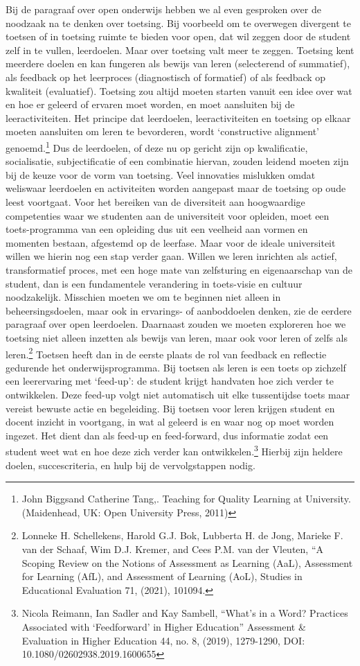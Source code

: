\documentclass[empirical, authordate, ]{new-jote-article}
\begin{document}
	Bij de paragraaf over open onderwijs hebben we al even gesproken over de noodzaak na te denken over toetsing. Bij voorbeeld om te overwegen divergent te toetsen of in toetsing ruimte te bieden voor open, dat wil zeggen door de student zelf in te vullen, leerdoelen. Maar over toetsing valt meer te zeggen. Toetsing kent meerdere doelen en kan fungeren als bewijs van leren (selecterend of summatief), als feedback op het leerproces (diagnostisch of formatief) of als feedback op kwaliteit (evaluatief). Toetsing zou altijd moeten starten vanuit een idee over wat en hoe er geleerd of ervaren moet worden, en moet aansluiten bij de leeractiviteiten. Het principe dat leerdoelen, leeractiviteiten en toetsing op elkaar moeten aansluiten om leren te bevorderen, wordt ‘constructive alignment' genoemd.\footnote{John Biggsand Catherine Tang,. Teaching for Quality Learning at University. (Maidenhead, UK: Open University Press, 2011)} Dus de leerdoelen, of deze nu op gericht zijn op kwalificatie, socialisatie, subjectificatie of een combinatie hiervan, zouden leidend moeten zijn bij de keuze voor de vorm van toetsing. Veel innovaties mislukken omdat weliswaar leerdoelen en activiteiten worden aangepast maar de toetsing op oude leest voortgaat. Voor het bereiken van de diversiteit aan hoogwaardige competenties waar we studenten aan de universiteit voor opleiden, moet een toets-programma van een opleiding dus uit een veelheid aan vormen en momenten bestaan, afgestemd op de leerfase. Maar voor de ideale universiteit willen we hierin nog een stap verder gaan. Willen we leren inrichten als actief, transformatief proces, met een hoge mate van zelfsturing en eigenaarschap van de student, dan is een fundamentele verandering in toets-visie en cultuur noodzakelijk. Misschien moeten we om te beginnen niet alleen in beheersingsdoelen, maar ook in ervarings- of aanboddoelen denken, zie de eerdere paragraaf over open leerdoelen. Daarnaast zouden we moeten exploreren hoe we toetsing niet alleen inzetten als bewijs van leren, maar ook voor leren of zelfs als leren.\footnote{Lonneke H. Schellekens, Harold G.J. Bok, Lubberta H. de Jong, Marieke F. van der Schaaf, Wim D.J. Kremer, and Cees P.M. van der Vleuten, “A Scoping Review on the Notions of Assessment as Learning (AaL), Assessment for Learning (AfL), and Assessment of Learning (AoL), Studies in Educational Evaluation 71, (2021), 101094.} Toetsen heeft dan in de eerste plaats de rol van feedback en reflectie gedurende het onderwijsprogramma. Bij toetsen als leren is een toets op zichzelf een leerervaring met ‘feed-up': de student krijgt handvaten hoe zich verder te ontwikkelen. Deze feed-up volgt niet automatisch uit elke tussentijdse toets maar vereist bewuste actie en begeleiding. Bij toetsen voor leren krijgen student en docent inzicht in voortgang, in wat al geleerd is en waar nog op moet worden ingezet. Het dient dan als feed-up en feed-forward, dus informatie zodat een student weet wat en hoe deze zich verder kan ontwikkelen.\footnote{Nicola Reimann, Ian Sadler and Kay Sambell, “What's in a Word? Practices Associated with ‘Feedforward' in Higher Education” Assessment \& Evaluation in Higher Education 44, no. 8, (2019), 1279-1290, DOI: 10.1080/02602938.2019.1600655} Hierbij zijn heldere doelen, succescriteria, en hulp bij de vervolgstappen nodig. 
\end{document}
